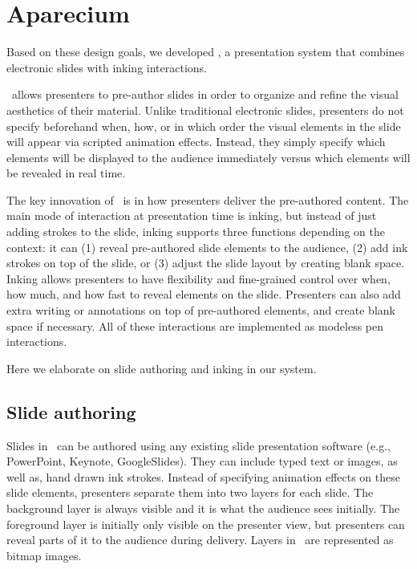 \section{Aparecium}

Based on these design goals, we developed \interface, a presentation system that combines electronic slides with inking interactions. 

\interface\ allows presenters to pre-author slides in order to organize and refine the visual aesthetics of their material.
%
Unlike traditional electronic slides, presenters do not specify beforehand when, how, or in which order the visual elements in the slide will appear via scripted animation effects. Instead, they simply specify which elements will be displayed to the audience immediately versus which elements will be revealed in real time. 

The key innovation of \interface\ is in how presenters deliver the pre-authored content.
The main mode of interaction at presentation time is inking, but instead of just adding strokes to the slide, inking supports three functions depending on the context: it can (1) reveal pre-authored slide elements to the audience, (2) add ink strokes on top of the slide, or (3) adjust the slide layout by creating blank space. Inking allows presenters to have flexibility and fine-grained control over when, how much, and how fast to reveal elements on the slide. Presenters can also add extra writing or annotations on top of pre-authored elements, and create blank space if necessary. All of these interactions are implemented as modeless pen interactions. 

Here we elaborate on slide authoring and inking in our system.

\subsection{Slide authoring}
Slides in \interface\ can be authored using any existing slide presentation software (e.g., PowerPoint, Keynote, GoogleSlides). They can include typed text or images, as well as, hand drawn ink strokes. Instead of specifying animation effects on these slide elements, presenters separate them into two layers for each slide. The background layer is always visible and it is what the audience sees initially. The foreground layer is initially only visible on the presenter view, but presenters can reveal parts of it to the audience during delivery.  Layers in \interface\ are represented as bitmap images. 

